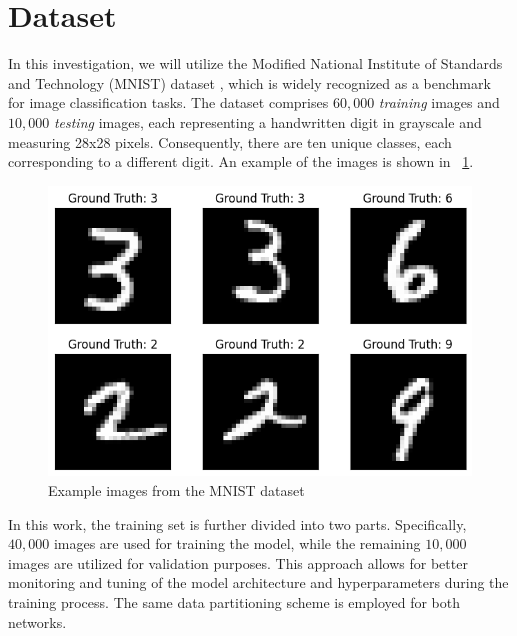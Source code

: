 \section{Dataset}

In this investigation, we will utilize the Modified National Institute of Standards and Technology (MNIST) dataset \cite{lecun-mnisthandwrittendigit-2010}, which is widely recognized as a benchmark for image classification tasks. The dataset comprises $60,000$ \textit{training} images and $10,000$ \textit{testing} images, each representing a handwritten digit in grayscale and measuring 28x28 pixels. Consequently, there are ten unique classes, each corresponding to a different digit. An example of the images is shown in \Fig~\ref{fig:mnist}.

\begin{figure}[h]
	\centering
	\includegraphics[width=0.6\linewidth]{ImageFiles/Dataset/mnist}
	\caption{Example images from the MNIST dataset}
	\label{fig:mnist}
\end{figure}

In this work, the training set is further divided into two parts. Specifically, $40,000$ images are used for training the model, while the remaining $10,000$ images are utilized for validation purposes. This approach allows for better monitoring and tuning of the model architecture and hyperparameters during the training process. The  same data partitioning scheme is employed for both networks.